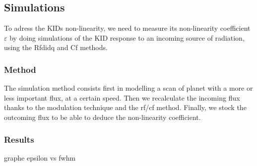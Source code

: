 
\subsection{Simulations}
To adress the KIDs non-linearity, we need to measure its non-linearity coefficient $\varepsilon$ by doing simulations of the KID response to an incoming source of radiation, using the Rfdidq and Cf methods.

	\subsubsection{Method}
The simulation method consists first in modelling a scan of planet with a more or less important flux, at a certain speed. Then we recalculate the incoming flux thanks to the modulation technique and the rf/cf method. Finally, we stock the outcoming flux to be able to deduce the non-linearity coefficient.

	\subsubsection{Results}
graphe epsilon vs fwhm
